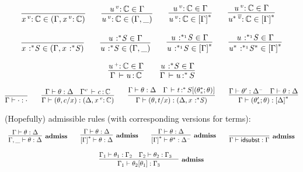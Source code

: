 \documentclass[11pt]{article}
\theoremstyle{plain}
\begin{document}
\[
\begin{array}{l}
\infer{\vtptm{x}{v}{\C} \in (\Gamma,\vtptm{x}{v}{\C})}
      {}
\qquad
\infer{\vtptm{u}{v}{\C} \in (\Gamma,\_)}
      {\vtptm{u}{v}{\C} \in \Gamma}
\qquad
\infer{\vtptm{u}{v}{\C} \in {\dupctx{\Gamma}{\vcond}}}
      {\vtptm{u}{v}{\C} \in \Gamma}
\qquad
\infer{\vtptm{\togglev{u}{\vcond}}{\flip{v}}{\C} \in {\dupctx{\Gamma}{\vcond}}}
      {\vtptm{u}{v}{\C} \in \Gamma}
\\ \\ 
\infer{\tptmv{x}{\vcond}{S} \in (\Gamma,\tptmv{x}{\vcond}{S})}
      {}
\qquad
\infer{\tptmv{u}{\vcond}{S} \in (\Gamma,\_)}
      {\tptmv{u}{\vcond}{S} \in \Gamma}
\qquad
\infer{\tptmv{u}{\vcond_1}{S} \in {\dupctx{\Gamma}{\vcond}}}
      {\tptmv{u}{\vcond_1}{S} \in \Gamma}
\qquad
\infer{\tptmv{\togglev{u}{\vcond}}{\vcond_1}{\togglev{S}{\vcond}} \in {\dupctx{\Gamma}{\vcond}}}
      {\tptmv{u}{\vcond_1}{S} \in {\Gamma}}
\end{array}
\]

\[
\infer{\ofdtp{\Gamma}{u}{\C}}{\vtptm{u}{\co}{\C} \in \Gamma}
\qquad
\infer{\oftpe{\Gamma}{u}{\vcond}{S}}
      {\tptmv{u}{\vcond}{S} \in \Gamma}
\]

\[
\infer{\wfsub{\Gamma}{\cdot}{\cdot}}{} 
\qquad
\infer{\wfsub{\Gamma}{(\theta,c/x)}{(\Delta,\vtptm{x}{v}{\C})}}
      {\wfsub{\Gamma}{\theta}{\Delta} & 
        \ofdtp{\Gamma^v}{c}{\C}
      }
\qquad
\infer{\wfsub{\Gamma}{(\theta,t/x)}{(\Delta,\tptmv{x}{\vcond}{S})}}
      {\wfsub{\Gamma}{\theta}{\Delta} & 
        \oftpe{\Gamma}{t}{\vcond}{\tsubst{S}{\substdup{\theta^\vcond}{\vcond}{\theta}}}
      }
\qquad
\infer{\wfsub{\Gamma}{\substdup{\theta'}{\vcond}{\theta}}{\dupctx{\Delta}{\vcond}}}
      {\wfsub{\Gamma}{\theta'}{\Delta^\con} &
       \wfsub{\Gamma}{\theta}{\Delta} 
      }
\]

(Hopefully) admissible rules (with corresponding versions for terms):   
\[
\begin{array}{c}
\infer[\admiss]
      {\wfsub{\Gamma,\_}{\theta}{\Delta}}
      {\wfsub{\Gamma}{\theta}{\Delta}}
\qquad
\infer[\admiss]
      {\wfsub{\dupctx{\Gamma}{\vcond}}{\theta}{\Delta}}
      {\wfsub{\Gamma}{\theta}{\Delta}}
\qquad
\infer[\admiss]
      {\wfsub{\dupctx{\Gamma}{\vcond}}{\theta^\vcond}{\Delta^\con}}
      {\wfsub{\Gamma}{\theta}{\Delta}}
\qquad
\infer[\admiss]
      {\wfsub{{\Gamma}}{\idsubst}{\Gamma}}
      {}
\\ \\
\infer[\admiss]
      {\wfsub{{\Gamma_1}}{\tsubst{\theta_2}{\theta_1}}{\Gamma_3}}
      {\wfsub{{\Gamma_1}}{\theta_1}{\Gamma_2} &
        \wfsub{{\Gamma_2}}{\theta_2}{\Gamma_3} &
      }
\end{array}
\]
\end{document}
